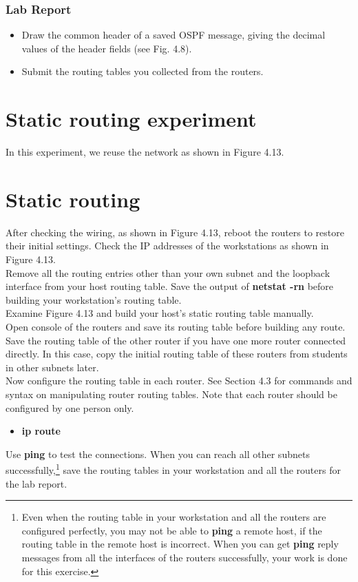 \documentclass[10pt,a4paper]{article}
\numberwithin{equation}{section}
\numberwithin{figure}{section}
\numberwithin{table}{section}
\begin{document}
    \subsubsection*{Lab Report}
    \begin{itemize}
        \setlength{\itemindent}{0pt}
        \item Draw the common header of a saved OSPF message, giving the decimal values of the header fields (see Fig. 4.8).
        \item Submit the routing tables you collected from the routers.
    \end{itemize}

\section*{Static routing experiment}
    In this experiment, we reuse the network as shown in Figure 4.13.
\section{Static routing}
    After checking the wiring, as shown in Figure 4.13, reboot the routers to restore their initial settings.
    Check the IP addresses of the workstations as shown in Figure 4.13. \\
    Remove all the routing entries other than your own subnet and the loopback interface from your host routing table.
    Save the output of \textbf{netstat -rn} before building your workstation’s routing table. \\
    Examine Figure 4.13 and build your host’s static routing table manually. \\
    Open console of the routers and save its routing table before building any route.
    Save the routing table of the other router if you have one more router connected directly.
    In this case, copy the initial routing table of these routers from students in other subnets later. \\
    Now configure the routing table in each router.
    See Section 4.3 for commands and syntax on manipulating router routing tables.
    Note that each router should be configured by one person only. \\
    \begin{itemize}
        \item \textbf{ip route} \textit{}
    \end{itemize}
    Use \textbf{ping} to test the connections.
    When you can reach all other subnets successfully,\footnote{Even when the routing table in your workstation and all the routers are configured perfectly, you may not be able to \textbf{ping} a remote host, if the routing table in the remote host is incorrect.
    When you can get \textbf{ping} reply messages from all the interfaces of the routers successfully, your work is done for this exercise.} save the routing tables in your workstation and all the routers for the lab report.
\end{document}
